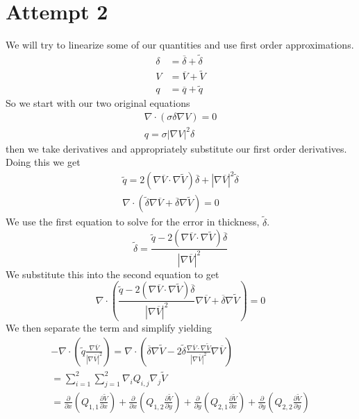 \documentclass[12pt]{article}
\begin{document}
\section{Attempt 2}
We will try to linearize some of our quantities and use first order approximations.
\begin{align*}
\delta &= \overline{\delta} + \widetilde{\delta}\\
V &= \overline{V} + \widetilde{V} \\
q &= \overline{q} + \widetilde{q} 
\end{align*}
So we start with our two original equations
\begin{gather*}
\nabla \cdot (\sigma \delta \nabla V) = 0 \\
q = \sigma |\nabla V|^2 \delta
\end{gather*}
then we take derivatives and appropriately substitute our first order derivatives.
Doing this we get
\begin{gather*}
\widetilde{q} = 2(\nabla \overline{V} \cdot \nabla \widetilde{V}) \overline{\delta} + |\nabla \overline{V}|^2 \widetilde{\delta} \\
\nabla \cdot (\widetilde{\delta}\nabla \overline{V}+ \overline{\delta} \nabla \widetilde{V}) = 0
\end{gather*}
We use the first equation to solve for the error in thickness, $\widetilde{\delta}$.
\[
\widetilde{\delta} = \frac{\widetilde{q} - 2(\nabla \overline{V} \cdot \nabla \widetilde{V}) \overline{\delta}}{|\nabla \overline{V}|^2 }
\]
We substitute this into the second equation to get
\[
\nabla \cdot \left(\frac{\widetilde{q} - 2\left(\nabla \overline{V} \cdot \nabla \widetilde{V} \right) \overline{\delta}}{|\nabla \overline{V}|^2 }\nabla \overline{V}+ \overline{\delta} \nabla \widetilde{V}\right) = 0
\]
We then separate the term and simplify yielding
\begin{gather*}
-\nabla \cdot \left( \widetilde{q} \frac{\nabla \overline{V}}{|\nabla \overline{V}|^2}\right) 
=
\nabla \cdot \left(\overline{\delta}\nabla \widetilde{V} -2 \widetilde{\delta} \frac{\nabla \overline{V}\cdot \nabla \widetilde{V}}{|\nabla \overline{V}|^2}\nabla\overline{V} \right) \\
= \sum_{i=1}^2\sum_{j=1}^2 \nabla_i Q_{i,j} \nabla_j \widetilde{V} \\
= 
\frac{\partial}{\partial x}\left(Q_{1,1}\frac{\partial \widetilde{V}}{\partial x}\right) 
+
\frac{\partial}{\partial x}\left(Q_{1,2}\frac{\partial \widetilde{V}}{\partial y}\right)
+
\frac{\partial}{\partial y}\left(Q_{2,1}\frac{\partial \widetilde{V}}{\partial x}\right)
+
\frac{\partial}{\partial y}\left(Q_{2,2}\frac{\partial \widetilde{V}}{\partial y}\right)
\end{gather*}
\end{document}
